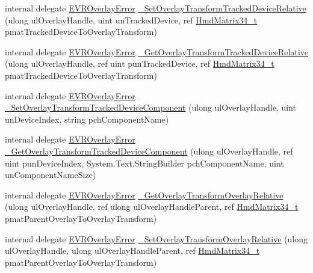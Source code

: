 \begin{DoxyCompactItemize}
\item 
internal delegate \mbox{\hyperlink{namespace_valve_1_1_v_r_aaee5c5144f42b7969d45b854f51b0c18}{E\+V\+R\+Overlay\+Error}} \mbox{\hyperlink{struct_valve_1_1_v_r_1_1_i_v_r_overlay_ac83c23b8afe439475d80d3e64db9878d}{\+\_\+\+Set\+Overlay\+Transform\+Tracked\+Device\+Relative}} (ulong ul\+Overlay\+Handle, uint un\+Tracked\+Device, ref \mbox{\hyperlink{struct_valve_1_1_v_r_1_1_hmd_matrix34__t}{Hmd\+Matrix34\+\_\+t}} pmat\+Tracked\+Device\+To\+Overlay\+Transform)
\item 
internal delegate \mbox{\hyperlink{namespace_valve_1_1_v_r_aaee5c5144f42b7969d45b854f51b0c18}{E\+V\+R\+Overlay\+Error}} \mbox{\hyperlink{struct_valve_1_1_v_r_1_1_i_v_r_overlay_aab0d31c4d5c91a030e4625b2f355f126}{\+\_\+\+Get\+Overlay\+Transform\+Tracked\+Device\+Relative}} (ulong ul\+Overlay\+Handle, ref uint pun\+Tracked\+Device, ref \mbox{\hyperlink{struct_valve_1_1_v_r_1_1_hmd_matrix34__t}{Hmd\+Matrix34\+\_\+t}} pmat\+Tracked\+Device\+To\+Overlay\+Transform)
\item 
internal delegate \mbox{\hyperlink{namespace_valve_1_1_v_r_aaee5c5144f42b7969d45b854f51b0c18}{E\+V\+R\+Overlay\+Error}} \mbox{\hyperlink{struct_valve_1_1_v_r_1_1_i_v_r_overlay_a3d145314a3a3a2bd5bf35892b56db863}{\+\_\+\+Set\+Overlay\+Transform\+Tracked\+Device\+Component}} (ulong ul\+Overlay\+Handle, uint un\+Device\+Index, string pch\+Component\+Name)
\item 
internal delegate \mbox{\hyperlink{namespace_valve_1_1_v_r_aaee5c5144f42b7969d45b854f51b0c18}{E\+V\+R\+Overlay\+Error}} \mbox{\hyperlink{struct_valve_1_1_v_r_1_1_i_v_r_overlay_aec5e286ed41c5cad482f21b6be152433}{\+\_\+\+Get\+Overlay\+Transform\+Tracked\+Device\+Component}} (ulong ul\+Overlay\+Handle, ref uint pun\+Device\+Index, System.\+Text.\+String\+Builder pch\+Component\+Name, uint un\+Component\+Name\+Size)
\item 
internal delegate \mbox{\hyperlink{namespace_valve_1_1_v_r_aaee5c5144f42b7969d45b854f51b0c18}{E\+V\+R\+Overlay\+Error}} \mbox{\hyperlink{struct_valve_1_1_v_r_1_1_i_v_r_overlay_a8cc0a138c05e5059bd41540d8f24800d}{\+\_\+\+Get\+Overlay\+Transform\+Overlay\+Relative}} (ulong ul\+Overlay\+Handle, ref ulong ul\+Overlay\+Handle\+Parent, ref \mbox{\hyperlink{struct_valve_1_1_v_r_1_1_hmd_matrix34__t}{Hmd\+Matrix34\+\_\+t}} pmat\+Parent\+Overlay\+To\+Overlay\+Transform)
\item 
internal delegate \mbox{\hyperlink{namespace_valve_1_1_v_r_aaee5c5144f42b7969d45b854f51b0c18}{E\+V\+R\+Overlay\+Error}} \mbox{\hyperlink{struct_valve_1_1_v_r_1_1_i_v_r_overlay_a316bb946cf3419e40e836a5876bc7522}{\+\_\+\+Set\+Overlay\+Transform\+Overlay\+Relative}} (ulong ul\+Overlay\+Handle, ulong ul\+Overlay\+Handle\+Parent, ref \mbox{\hyperlink{struct_valve_1_1_v_r_1_1_hmd_matrix34__t}{Hmd\+Matrix34\+\_\+t}} pmat\+Parent\+Overlay\+To\+Overlay\+Transform)

\end{DoxyCompactItemize}
